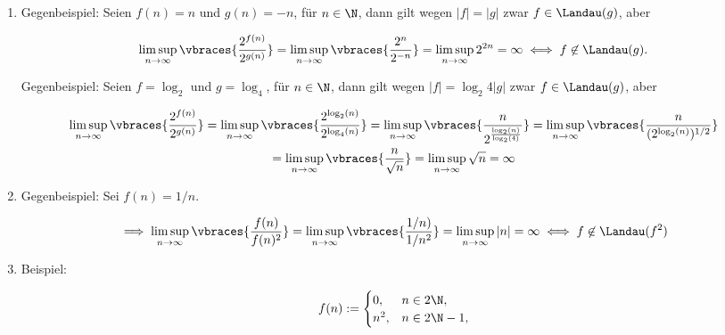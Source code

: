 \begin{solution}
\begin{enumerate}[label = (\alph*)]
  \item Gegenbeispiel:
  Seien $f(n) = n$ und $g(n) = -n$, für $n \in \N$, dann gilt wegen $|f| = |g|$ zwar $f \in \Landau(g)$, aber

  \begin{align*}
    \limsup_{n \to \infty}
    \vbraces
    {
      \frac
      {
        2^{f(n)}
      }{
        2^{g(n)}
      }
    }
    =
    \limsup_{n \to \infty}
    \vbraces
    {
      \frac
      {
        2^{n}
      }{
        2^{-n}
      }
    }
    =
    \limsup_{n \to \infty}
    2^{2n}
    =
    \infty
    \iff
    f \not \in \Landau(g).
  \end{align*}

  Gegenbeispiel:
  Seien $f = \log_2$ und $g = \log_4$, für $n \in \N$, dann gilt wegen $|f| = \log_2{4} |g|$ zwar $f \in \Landau(g)$, aber

  \begin{multline*}
    \limsup_{n  \to \infty}
    \vbraces
    {
      \frac
      {
        2^{f(n)}
      }{
        2^{g(n)}
      }
    }
    =
    \limsup_{n  \to \infty}
    \vbraces
    {
      \frac
      {
        2^{\log_2(n)}
      }{
        2^{\log_4(n)}
      }
    }
    =
    \limsup_{n  \to \infty}
    \vbraces
    {
      \frac
      {
        n
      }{
        2^\frac
        {
          \log_2(n)
        }{
          \log_2(4)
        }
      }
    }
    =
    \limsup_{n  \to \infty}
    \vbraces
    {
      \frac
      {
        n
      }{
        (2^{\log_2(n)})^{1/2}
      }
    } \\
    =
    \limsup_{n  \to \infty}
    \vbraces
    {
      \frac
      {
        n
      }{
        \sqrt{n}
      }
    }
    =
    \limsup_{n  \to \infty}
    \sqrt{n}
    =
    \infty
  \end{multline*}

  \item Gegenbeispiel:
  Sei $f(n) = 1/n$.

  \begin{align*}
    \implies
    \limsup_{n \to \infty}
    \vbraces
    {
      \frac{f(n)}{f(n)^2}
    }
    =
    \limsup_{n \to \infty}
    \vbraces
    {
      \frac{1/n)}{1/n^2}
    }
    =
    \limsup_{n \to \infty} |n|
    =
    \infty
    \iff
    f \not \in \Landau(f^2)
  \end{align*}

  \item Beispiel:

  \begin{align*}
    f(n)
    :=
    \begin{cases}
      0,   & n \in 2 \N, \\
      n^2, & n \in 2 \N - 1,
    \end{cases}
  \end{align*}


\end{enumerate}
\end{solution}
